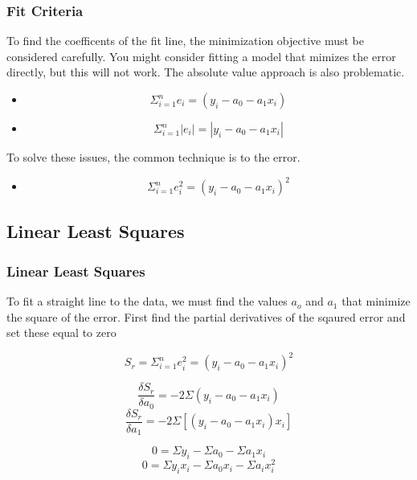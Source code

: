 \documentclass[fleqn]{beamer} %
\newcommand{\sectionIIsubsectionIItitle}{Fit Criteria}
\newcommand{\sectionIIsubsectionIIItitle}{Linear Least Squares}
\begin{document}
			\begin{frame}
				\frametitle{\sectionIIsubsectionIItitle}
				\bigskip
				
				To find the coefficents of the fit line, the minimization objective must be considered carefully. You might consider fitting a model that mimizes the error directly, but this will not work. The absolute value approach is also problematic.
\vspace{2mm}
          \begin{itemize}
            \item \[\Sigma_{i=1}^n e_i = \left(y_i-a_0-a_1x_i\right)\] \vspace{3mm}
            \item \[\Sigma_{i=1}^n |e_i| = \left|y_i-a_0-a_1x_i\right|\] \vspace{3mm}
          \end{itemize}
 \vspace{3mm}    
 To solve these issues, the common technique is to \underline{\hspace{25mm}} the error.\vspace{3mm}
          \begin{itemize}
             \item \[\Sigma_{i=1}^n e_i^2 = \left(y_i-a_0-a_1x_i\right)^2\] \vspace{3mm}
          \end{itemize}

       
			\btVFill 
			\end{frame}	

		\subsection{\sectionIIsubsectionIIItitle}\label{sectionIIsubsectionIII}

			\begin{frame}
				\frametitle{\sectionIIsubsectionIIItitle}
				\bigskip
				
				To fit a straight line to the data, we must find the values $a_o$ and $a_1$ that minimize the square of the error. First find the partial derivatives of the sqaured error and set these equal to zero

				\[ S_r=\Sigma_{i=1}^ne_i^2=\left(y_i-a_0-a_1x_i\right)^2 \]
					
				\[ \frac{\delta S_r}{\delta a_0} = -2 \Sigma\left( y_i - a_0 - a_1x_i \right) \]
				\[ \frac{\delta S_r}{\delta a_1} = -2 \Sigma\left[ \left( y_i - a_0 - a_1x_i\right)x_i\right]\]

				\[ 0 = \Sigma y_i - \Sigma a_0 - \Sigma a_1x_i \]
				\[ 0 = \Sigma y_ix_i - \Sigma a_0x_i - \Sigma a_ix_i^2\]

				
				\btVFill 
			\end{frame}
\end{document}
